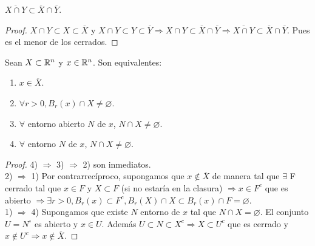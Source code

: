 \begin{prop}
  $\overline{X \cap Y} \subset \overline{X} \cap \overline{Y}$.
  \begin{proof}
    $X \cap Y \subset X \subset \overline{X}$ y $X \cap Y \subset Y \subset \overline{Y} \Rightarrow X \cap Y \subset \overline{X} \cap \overline{Y} \Rightarrow \overline{X \cap Y} \subset \overline{X} \cap \overline{Y}$. Pues es el menor de los cerrados.
  \end{proof}
\end{prop}

\begin{prop}
  Sean $X \subset \mathbb{R}^n$ y $x \in \mathbb{R}^n$. Son equivalentes:
  \begin{enumerate}
    \item $x \in \overline{X}$.
    \item $\forall r > 0, B_r(x) \cap X \neq \varnothing$.
    \item $\forall$ entorno abierto $N$ de $x$, $N \cap X \neq \varnothing$.
    \item $\forall$ entorno $N$ de $x$, $N \cap X \neq \varnothing$.
  \end{enumerate}

  \begin{proof}
    4) $\Rightarrow$ 3) $\Rightarrow$ 2) son inmediatos. \\
    2) $\Rightarrow$ 1) Por contrarrecíproco, supongamos que $x \notin \overline{X}$ de manera tal que $\exists$ F cerrado tal que $x \in F$ y $X \subset F$ (si no estaría en la clasura) $\Rightarrow x \in F^c$ que es abierto $\Rightarrow \exists r > 0, B_r(x) \subset F^c, B_r(X) \cap X \subset B_r(x) \cap F = \varnothing$. \\
    1) $\Rightarrow$ 4) Supongamos que existe $N$ entorno de $x$ tal que $N \cap X = \varnothing$. El conjunto $U = N^{\circ}$ es abierto y $x \in U$. Además $U \subset N \subset X^c \Rightarrow X \subset U^c$ que es cerrado y $x \notin U^c \Rightarrow x \notin \overline{X}$.
  \end{proof}
\end{prop}

